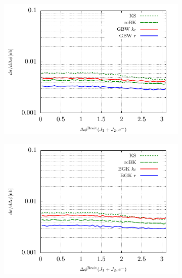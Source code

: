 \documentclass[11pt]{article}
\numberwithin{equation}{section}
\numberwithin{table}{section}
\numberwithin{figure}{section}
\begin{document}
\begin{figure}[p]
	\begin{subfigure}{0.5\textwidth}
	\includegraphics[width=\textwidth]{plots/plotGBW1} 
	\end{subfigure}
	\begin{subfigure}{0.5\textwidth}
	\includegraphics[width=\textwidth]{plots/plotBGK1} 
	\end{subfigure}\\
	\begin{subfigure}{0.5\textwidth}

\end{subfigure}
\end{figure}
\end{document}

